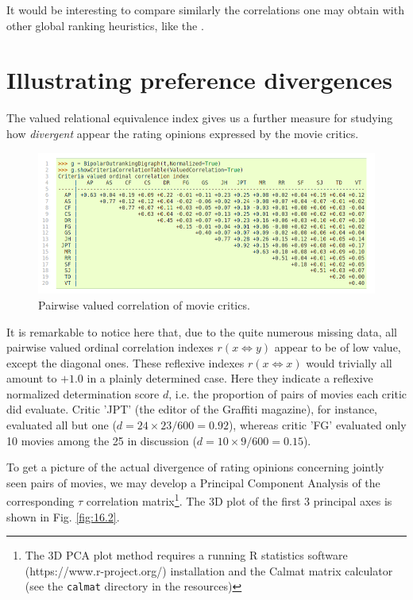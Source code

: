 It would be interesting to compare similarly the correlations one may obtain with other global ranking heuristics, like the \Copeland.

\section{Illustrating preference divergences}
\label{sec:16.4}

The valued relational equivalence index gives us a further measure for studying how \emph{divergent} appear the rating opinions expressed by the movie critics.
\begin{figure}[h]
\sidecaption
\includegraphics[width=12cm]{Figures/correlationTable.png}
\caption{Pairwise valued correlation of movie critics.} 
\label{fig:16.6}       %
\end{figure}

It is remarkable to notice here that, due to the quite numerous missing data, all pairwise valued ordinal correlation indexes $r(x\Leftrightarrow y)$ appear to be of low value, except the diagonal ones. These reflexive indexes $r(x\Leftrightarrow x)$ would trivially all amount to $+1.0$ in a plainly determined case. Here they indicate a reflexive normalized determination score $d$, i.e. the proportion of pairs of movies each critic did evaluate. Critic 'JPT' (the editor of the Graffiti magazine), for instance, evaluated all but one ($d = 24\times23/600 = 0.92$), whereas critic 'FG' evaluated only 10 movies among the 25 in discussion ($d = 10\times9/600 = 0.15$).

To get a picture of the actual divergence of rating opinions concerning jointly seen pairs of movies, we may develop a Principal Component Analysis of the corresponding $\tau$ correlation matrix\footnote{The 3D PCA plot method requires a running R statistics software  (https://www.r-project.org/) installation and the Calmat matrix calculator (see the \texttt{calmat} directory in the \Digraph resources)}. The 3D plot of the first 3 principal axes is shown in Fig. \ref{fig:16.2}.

